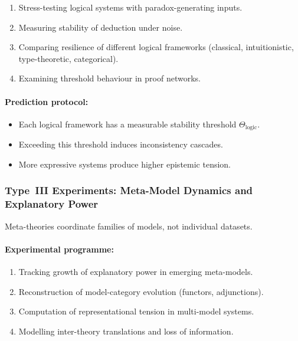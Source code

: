 \begin{enumerate}
    \item Stress-testing logical systems with paradox-generating inputs.
    \item Measuring stability of deduction under noise.
    \item Comparing resilience of different logical frameworks 
          (classical, intuitionistic, type-theoretic, categorical).
    \item Examining threshold behaviour in proof networks.
\end{enumerate}

\paragraph{Prediction protocol:}

\begin{itemize}
    \item Each logical framework has a measurable stability threshold 
          $\Theta_{\mathrm{logic}}$.
    \item Exceeding this threshold induces inconsistency cascades.
    \item More expressive systems produce higher epistemic tension.
\end{itemize}



\subsubsection{Type~III Experiments: Meta-Model Dynamics and Explanatory Power}

Meta-theories coordinate families of models, not individual datasets.

\paragraph{Experimental programme:}

\begin{enumerate}
    \item Tracking growth of explanatory power in emerging meta-models.
    \item Reconstruction of model-category evolution (functors, adjunctions).
    \item Computation of representational tension in multi-model systems.
    \item Modelling inter-theory translations and loss of information.
\end{enumerate}

